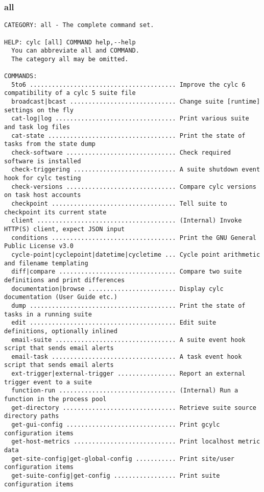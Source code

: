 \subsubsection{all}
\label{all}
\begin{lstlisting}
CATEGORY: all - The complete command set.

HELP: cylc [all] COMMAND help,--help
  You can abbreviate all and COMMAND.
  The category all may be omitted.

COMMANDS:
  5to6 ........................................ Improve the cylc 6 compatibility of a cylc 5 suite file
  broadcast|bcast ............................. Change suite [runtime] settings on the fly
  cat-log|log ................................. Print various suite and task log files
  cat-state ................................... Print the state of tasks from the state dump
  check-software .............................. Check required software is installed
  check-triggering ............................ A suite shutdown event hook for cylc testing
  check-versions .............................. Compare cylc versions on task host accounts
  checkpoint .................................. Tell suite to checkpoint its current state
  client ...................................... (Internal) Invoke HTTP(S) client, expect JSON input
  conditions .................................. Print the GNU General Public License v3.0
  cycle-point|cyclepoint|datetime|cycletime ... Cycle point arithmetic and filename templating
  diff|compare ................................ Compare two suite definitions and print differences
  documentation|browse ........................ Display cylc documentation (User Guide etc.)
  dump ........................................ Print the state of tasks in a running suite
  edit ........................................ Edit suite definitions, optionally inlined
  email-suite ................................. A suite event hook script that sends email alerts
  email-task .................................. A task event hook script that sends email alerts
  ext-trigger|external-trigger ................ Report an external trigger event to a suite
  function-run ................................ (Internal) Run a function in the process pool
  get-directory ............................... Retrieve suite source directory paths
  get-gui-config .............................. Print gcylc configuration items
  get-host-metrics ............................ Print localhost metric data
  get-site-config|get-global-config ........... Print site/user configuration items
  get-suite-config|get-config ................. Print suite configuration items

\end{lstlisting}
